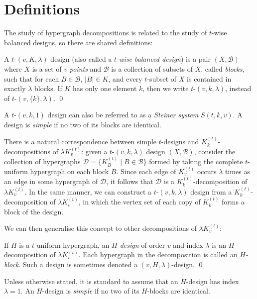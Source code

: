 \section{Definitions}

The study of hypergraph decompositions is related to the study of $t$-wise balanced designs, so there are shared definitions:

\begin{definition}
A $t$-$(v,K,\lambda)$ design (also called a {\em $t$-wise balanced design}) is a pair $(X, \mathcal{B})$ where $X$ is a set of $v$ {\em points} and $\mathcal{B}$ is a collection of subsets of $X$, called {\em blocks}, such that for each $B \in \mathcal{B}$, $|B| \in K$, and every $t$-subset of $X$ is contained in exactly $\lambda$ blocks.
If $K$ has only one element $k$, then we write $t$-$(v, k, \lambda)$, instead of $t$-$(v,\{k\},\lambda)$.
\qed
\end{definition}

A $t$-$(v, k, 1)$ design can also be referred to as a {\em Steiner system} $S(t, k, v)$.
A design is {\em simple} if no two of its blocks are identical.

There is a natural correspondence between simple $t$-designs and $K_{k}^{(t)}$-decompositions of $\lambda K_{v}^{(t)}$: given a $t$-$(v, k, \lambda)$ design $(X, \mathcal{B})$, consider the collection of hypergraphs $\mathcal{D} = \{K_{B}^{(t)} \mid B \in \mathcal{B}\}$ formed by taking the complete $t$-uniform hypergraph on each block $B$.
Since each edge of $K_v^{(t)}$ occurs $\lambda$ times as an edge in some hypergraph of $\mathcal{D}$, it follows that $\mathcal{D}$ is a $K_{k}^{(t)}$-decomposition of $\lambda K_{v}^{(t)}$.
In the same manner, we can construct a $t$-$(v, k, \lambda)$ design from a $K_{k}^{(t)}$-decomposition of $\lambda K_{v}^{(t)}$, in which the vertex set of each copy of $K_k^{(t)}$ forms a block of the design.

We can then generalise this concept to other decompositions of $\lambda K_{v}^{(t)}$:

\begin{definition}
If $H$ is a $t$-uniform hypergraph, an {\em $H$-design} of order $v$ and index $\lambda$ is an $H$-decomposition of $\lambda K_{v}^{(t)}$.
Each hypergraph in the decomposition is called an {\em $H$-block}.
Such a design is sometimes denoted a $(v, H, \lambda)$-design.
\qed
\end{definition}

Unless otherwise stated, it is standard to assume that an $H$-design has index $\lambda = 1$.
An $H$-design is {\em simple} if no two of its $H$-blocks are identical.

